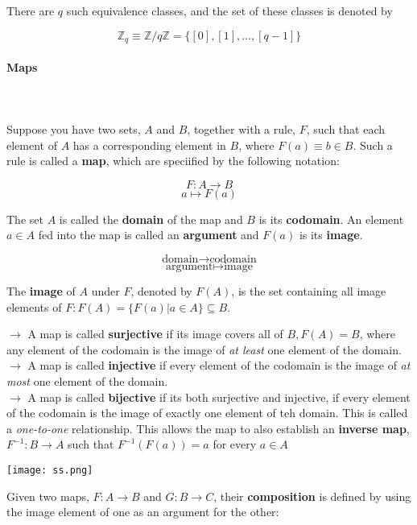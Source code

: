 \documentclass[11pt, oneside]{article}   	%
\begin{document}
There are $q$ such equivalence classes, and the set of these classes is denoted by 

\[ \mathbb{Z}_q \equiv \mathbb{Z} / q\mathbb{Z} = \{[0], [1], ..., [q-1]\} \]

\paragraph{Maps} \mbox{} \\ \\ 

Suppose you have two sets, $A$ and $B$, together with a rule, $F$, such that each element of $A$ has a corresponding element in $B$, where $F(a) \equiv b \in B$. Such a rule is called a \textbf{map}, which are speciified by the following notation: 

\[ F: A \rightarrow B \]
\[ a \mapsto F(a) \] 

The set $A$ is called the \textbf{domain} of the map and $B$ is its \textbf{codomain}. An element $a \in A$ fed into the map is called an \textbf{argument} and $F(a)$ is its \textbf{image}. 

\[ \text{domain} \rightarrow \text{codomain} \]
\[ \text{argument} \mapsto \text{image} \]

The \textbf{image} of $A$ under $F$, denoted by $F(A)$, is the set containing all image elements of $F: F(A) = \{ F(a) | a \in A\} \subseteq B$. 

$\rightarrow$ A map is called \textbf{surjective} if its image covers all of $B, F(A) = B$, where any element of the codomain is the image of \textit{at least} one element of the domain.  \\
\indent $\rightarrow$ A map is called \textbf{injective} if every element of the codomain is the image of \textit{at most} one element of the domain. \\
\indent $\rightarrow$ A map is called \textbf{bijective} if its both surjective and injective, if every element of the codomain is the image of exactly one element of teh domain. This is called a \textit{one-to-one} relationship. This allows the map to also establish an \textbf{inverse map}, $F^{-1}: B \rightarrow A$ such that $F^{-1}(F(a)) = a$ for every $a \in A$ \\ 

\begin{center}
  \texttt{[image: ss.png]}
\end{center}

Given two maps, $F: A \rightarrow B$ and $G: B \rightarrow C$, their \textbf{composition} is defined by using the image element of one as an argument for the other: 
\end{document}
